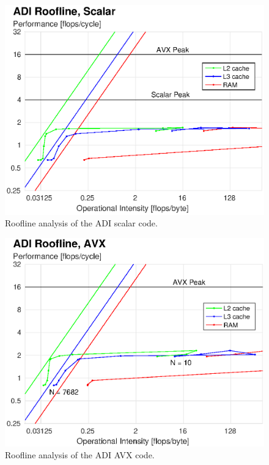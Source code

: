 \documentclass[letterpaper]{article}
\begin{document}
\begin{figure}\centering
  \includegraphics[width=\linewidth]{./plots/roofline_ADI_scalar.eps}
  \caption{Roofline analysis of the ADI scalar code.}
  \label{fig:roofline_ADI_scalar}
\end{figure}

\begin{figure}[H]\centering
  \includegraphics[width=\linewidth]{./plots/roofline_ADI_AVX.eps}
  \caption{Roofline analysis of the ADI AVX code.}
  \label{fig:roofline_ADI_AVX}
\end{figure}
\end{document}
